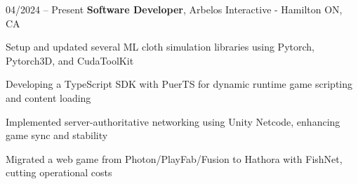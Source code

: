 \begin{twocolentry}{
    04/2024 – Present
}
\fontsize{11 pt}{11 pt}\textbf{Software Developer}, Arbelos Interactive - Hamilton ON, CA \end{twocolentry}

\vspace{0.10 cm}
\begin{onecolentry}
   \begin{highlights}
       \item Setup and updated several ML cloth simulation libraries using Pytorch, Pytorch3D, and CudaToolKit
       \item Developing a TypeScript SDK with PuerTS for dynamic runtime game scripting and content loading
       \item Implemented server-authoritative networking using Unity Netcode, enhancing game sync and stability
       \item Migrated a web game from Photon/PlayFab/Fusion to Hathora with FishNet, cutting operational costs
   \end{highlights}
\end{onecolentry}